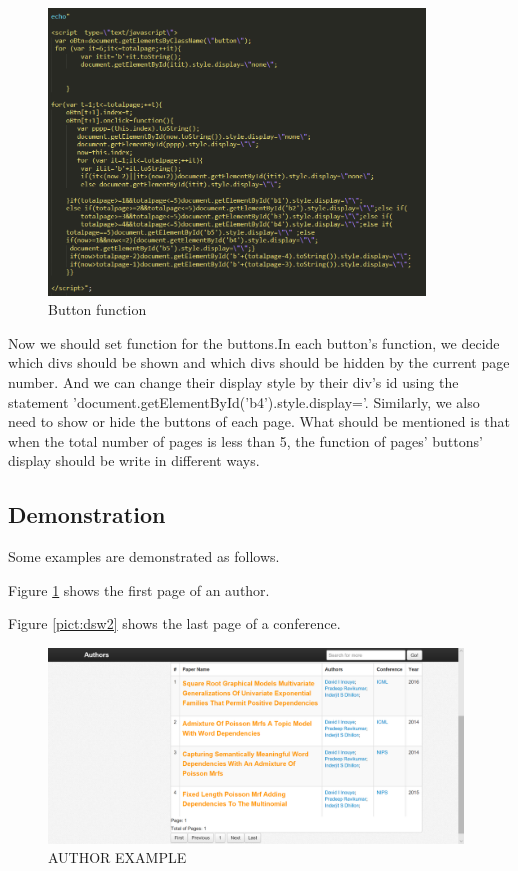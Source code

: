 \documentclass{book}
\begin{document}
\begin{figure}[H]
\centering
\includegraphics[width=10.0cm]{img/dsw_fun.png}
\caption{Button function}
\end{figure}

Now we should set function for the buttons.In each button's function, we decide which divs should be shown and which divs should be hidden by the current page number. And we can change their display style by their div's id using the statement 'document.getElementById('b4').style.display='. Similarly, we also need to show or hide the buttons of each page. What should be mentioned is that when the total number of pages is less than 5, the function of pages' buttons' display should be write in different ways.





\subsection{Demonstration}
Some examples are demonstrated as follows.

Figure \ref{pict:dsw1} shows the first page of an author.

Figure \ref{pict:dsw2} shows the last page of a conference.

\begin{figure}[b]
\centering
\includegraphics[width=11.0cm]{img/dsw_author.png}
\caption{AUTHOR EXAMPLE}
\label{pict:dsw1}
\end{figure}
\end{document}
